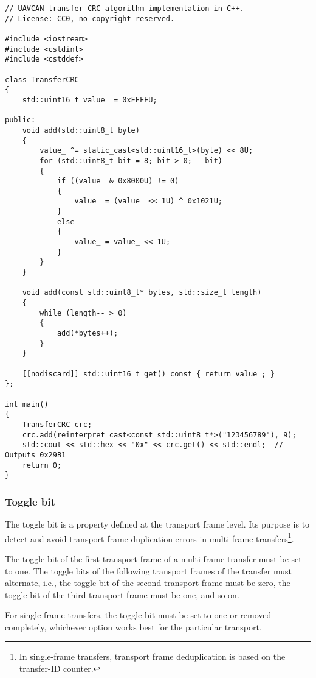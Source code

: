\begin{minipage}{0.9\textwidth}
\begin{verbatim}
// UAVCAN transfer CRC algorithm implementation in C++.
// License: CC0, no copyright reserved.

#include <iostream>
#include <cstdint>
#include <cstddef>

class TransferCRC
{
    std::uint16_t value_ = 0xFFFFU;

public:
    void add(std::uint8_t byte)
    {
        value_ ^= static_cast<std::uint16_t>(byte) << 8U;
        for (std::uint8_t bit = 8; bit > 0; --bit)
        {
            if ((value_ & 0x8000U) != 0)
            {
                value_ = (value_ << 1U) ^ 0x1021U;
            }
            else
            {
                value_ = value_ << 1U;
            }
        }
    }

    void add(const std::uint8_t* bytes, std::size_t length)
    {
        while (length-- > 0)
        {
            add(*bytes++);
        }
    }

    [[nodiscard]] std::uint16_t get() const { return value_; }
};

int main()
{
    TransferCRC crc;
    crc.add(reinterpret_cast<const std::uint8_t*>("123456789"), 9);
    std::cout << std::hex << "0x" << crc.get() << std::endl;  // Outputs 0x29B1
    return 0;
}
\end{verbatim}
\end{minipage}

\subsubsection{Toggle bit}\label{sec:toggle_bit}

The toggle bit is a property defined at the transport frame level.
Its purpose is to detect and avoid transport frame duplication errors in multi-frame
transfers\footnote{In single-frame transfers, transport frame deduplication is based on the transfer-ID counter.}.

The toggle bit of the first transport frame of a multi-frame transfer must be set to one.
The toggle bits of the following transport frames of the transfer must alternate,
i.e., the toggle bit of the second transport frame must be zero,
the toggle bit of the third transport frame must be one, and so on.

For single-frame transfers, the toggle bit must be set to one or removed completely,
whichever option works best for the particular transport.

